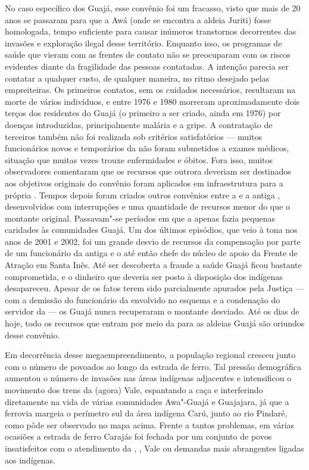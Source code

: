 No caso específico dos Guajá, esse convênio foi um fracasso, visto que
mais de 20 anos se passaram para que a  Awá (onde se encontra a aldeia
Juriti) fosse homologada, tempo suficiente para causar inúmeros
transtornos decorrentes das invasões e exploração ilegal desse
território. Enquanto isso, os programas de saúde que vieram com as
frentes de contato não se preocuparam com os riscos evidentes diante da
fragilidade das pessoas contatadas. A intenção parecia ser contatar a
qualquer custo, de qualquer maneira, no ritmo desejado pelas
empreiteiras. Os primeiros contatos, sem os cuidados necessários,
resultaram na morte de vários indivíduos, e entre 1976 e 1980 morreram
aproximadamente dois terços dos residentes do  Guajá (o primeiro a
ser criado, ainda em 1976) por doenças introduzidas, principalmente
malária e a gripe. A contratação de terceiros também não foi realizada
sob critérios satisfatórios --- muitos funcionários novos e temporários da
 não foram submetidos a exames médicos, situação que muitas vezes
trouxe enfermidades e óbitos. Fora isso, muitos observadores comentaram
que os recursos que outrora deveriam ser destinados aos objetivos
originais do convênio foram aplicados em infraestrutura para a própria
. Tempos depois foram criados outros convênios entre a  e a
antiga , desenvolvidos com interrupções e uma quantidade de recursos
menor do que o montante original. Passavam"-se períodos em que a 
apenas fazia pequenas caridades às comunidades Guajá. Um dos últimos
episódios, que veio à tona nos anos de 2001 e 2002, foi um grande desvio
de recursos da compensação por parte de um funcionário da antiga  e
o até então chefe do núcleo de apoio da Frente de Atração em Santa Inês.
Até ser descoberta a fraude a saúde Guajá ficou bastante comprometida, e
o dinheiro que deveria ser posto à disposição dos indígenas desapareceu.
Apesar de os fatos terem sido parcialmente apurados pela Justiça --- com a
demissão do funcionário da  envolvido no esquema e a condenação do
servidor da  --- os Guajá nunca recuperaram o montante desviado. Até
os dias de hoje, todo os recursos que entram por meio da  para as
aldeias Guajá são oriundos desse convênio.

Em decorrência desse megaempreendimento, a população regional cresceu
junto com o número de povoados ao longo da estrada de ferro. Tal pressão
demográfica aumentou o número de invasões nas áreas indígenas adjacentes
e intensificou o movimento dos trens da (agora) Vale, espantando a caça
e interferindo diretamente na vida de várias comunidades Awa"-Guajá e
Guajajara, já que a ferrovia margeia o perímetro sul da área indígena
Carú, junto ao rio Pindaré, como pôde ser observado no mapa acima.
Frente a tantos problemas, em várias ocasiões a estrada de ferro Carajás
foi fechada por um conjunto de povos insatisfeitos com o atendimento da
, , Vale ou demandas mais abrangentes ligadas aos indígenas.


